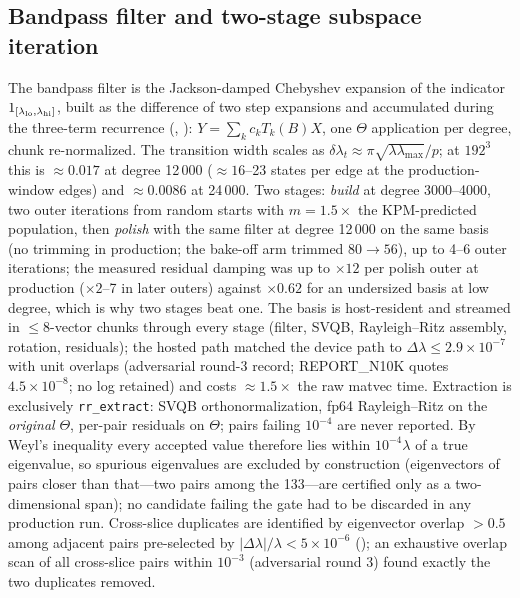 \documentclass[aps,prl,preprint,superscriptaddress,longbibliography,nofootinbib]{revtex4-2}
\begin{document}
\subsection{Bandpass filter and two-stage subspace iteration}
The bandpass filter is the Jackson-damped Chebyshev expansion of the indicator $1_{[\lambda_{\rm lo},\lambda_{\rm hi}]}$, built as the difference of two step expansions and accumulated during the three-term recurrence (, ): $Y=\sum_k c_k T_k(B)X$, one $\Theta$ application per degree, chunk re-normalized. The transition width scales as $\delta\lambda_t\approx\pi\sqrt{\lambda\lambda_{\max}}/p$; at $192^3$ this is $\approx0.017$ at degree 12\,000 ($\approx16$--23 states per edge at the production-window edges) and $\approx0.0086$ at 24\,000. Two stages: \emph{build} at degree 3000--4000, two outer iterations from random starts with $m=1.5\times$ the KPM-predicted population, then \emph{polish} with the same filter at degree 12\,000 on the same basis (no trimming in production; the bake-off arm trimmed $80\to56$), up to 4--6 outer iterations; the measured residual damping was up to $\times12$ per polish outer at production ($\times2$--7 in later outers) against $\times0.62$ for an undersized basis at low degree, which is why two stages beat one. The basis is host-resident and streamed in $\le8$-vector chunks through every stage (filter, SVQB, Rayleigh--Ritz assembly, rotation, residuals); the hosted path matched the device path to $\Delta\lambda\le2.9\times10^{-7}$ with unit overlaps (adversarial round-3 record; REPORT\_N10K quotes $4.5\times10^{-8}$; no log retained) and costs $\approx1.5\times$ the raw matvec time. Extraction is exclusively \texttt{rr\_extract}: SVQB orthonormalization, fp64 Rayleigh--Ritz on the \emph{original} $\Theta$, per-pair residuals on $\Theta$; pairs failing $10^{-4}$ are never reported. By Weyl's inequality every accepted value therefore lies within $10^{-4}\lambda$ of a true eigenvalue, so spurious eigenvalues are excluded by construction (eigenvectors of pairs closer than that---two pairs among the 133---are certified only as a two-dimensional span); no candidate failing the gate had to be discarded in any production run. Cross-slice duplicates are identified by eigenvector overlap $>0.5$ among adjacent pairs pre-selected by $|\Delta\lambda|/\lambda<5\times10^{-6}$ (); an exhaustive overlap scan of all cross-slice pairs within $10^{-3}$ (adversarial round 3) found exactly the two duplicates removed.
\end{document}
